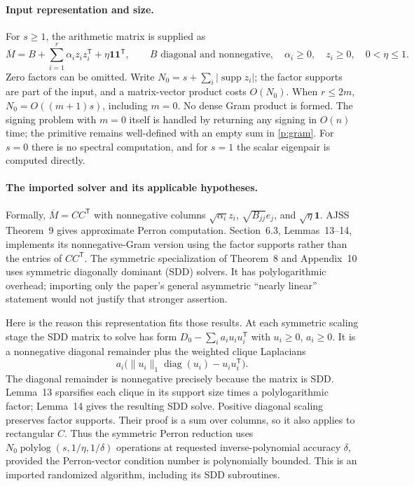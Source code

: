 \documentclass[11pt]{amsart}
\theoremstyle{definition}\newtheorem{definition}[theorem]{Definition}
\theoremstyle{remark}\newtheorem{remark}[theorem]{Remark}
\numberwithin{equation}{section}
\begin{document}
\paragraph{Input representation and size.}
For $s\ge1$, the arithmetic matrix is supplied as
\begin{equation}\label{p:gram}
 \overline M=B+\sum_{i=1}^{r}\alpha_i z_i z_i^{\mathsf T}
                 +\eta\mathbf1\mathbf1^{\mathsf T},
 \qquad B\text{ diagonal and nonnegative},\quad
 \alpha_i\ge0,\quad z_i\ge0,\quad0<\eta\le1.
\end{equation}
Zero factors can be omitted.  Write
$N_0=s+\sum_i|\operatorname{supp}z_i|$; the factor supports are part of the
input, and a matrix-vector product costs $O(N_0)$.  When $r\le2m$,
$N_0=O((m+1)s)$, including $m=0$.  No dense Gram product is formed.
The signing problem with $m=0$ itself is handled by returning any signing
in $O(n)$ time; the primitive remains well-defined with an empty sum in
\eqref{p:gram}.  For $s=0$ there is no spectral computation, and for $s=1$
the scalar eigenpair is computed directly.

\paragraph{The imported solver and its applicable hypotheses.}
Formally, $\overline M=CC^{\mathsf T}$ with nonnegative columns
$\sqrt{\alpha_i}z_i$, $\sqrt{B_{jj}}e_j$, and $\sqrt\eta\mathbf1$.
AJSS Theorem~9 gives approximate Perron computation.  Section~6.3,
Lemmas~13--14, implements its nonnegative-Gram version using the factor
supports rather than the entries of $CC^{\mathsf T}$.  The symmetric
specialization of Theorem~8 and Appendix~10 uses symmetric diagonally
dominant (SDD) solvers.  It has polylogarithmic overhead; importing only
the paper's general asymmetric ``nearly linear'' statement would not
justify that stronger assertion.

Here is the reason this representation fits those results.  At each
symmetric scaling stage the SDD matrix to solve has form
$D_0-\sum_i a_i u_i u_i^{\mathsf T}$ with $u_i\ge0$, $a_i\ge0$.
It is a nonnegative diagonal remainder plus the weighted clique
Laplacians
\begin{equation}\label{p:cliques}
 a_i\bigl(\|u_i\|_1\operatorname{diag}(u_i)
                    -u_i u_i^{\mathsf T}\bigr).
\end{equation}
The diagonal remainder is nonnegative precisely because the matrix is
SDD.  Lemma~13 sparsifies each clique in its support size times a
polylogarithmic factor; Lemma~14 gives the resulting SDD solve.
Positive diagonal scaling preserves factor supports.  Their proof is a
sum over columns, so it also applies to rectangular $C$.  Thus the
symmetric Perron reduction uses
$N_0\operatorname{polylog}(s,1/\eta,1/\delta)$ operations at requested
inverse-polynomial accuracy $\delta$, provided the Perron-vector
condition number is polynomially bounded.  This is an imported
randomized algorithm, including its SDD subroutines.
\end{document}
